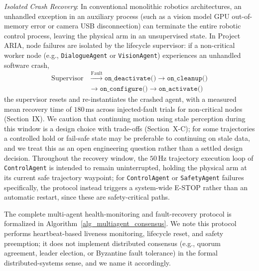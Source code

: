 \documentclass[journal]{IEEEtran}
\begin{document}
\textit{Isolated Crash Recovery}: In conventional monolithic robotics architectures, an unhandled exception in an auxiliary process (such as a vision model GPU out-of-memory error or camera USB disconnection) can terminate the entire robotic control process, leaving the physical arm in an unsupervised state. In Project ARIA, node failures are isolated by the lifecycle supervisor: if a non-critical worker node (e.g., \texttt{DialogueAgent} or \texttt{VisionAgent}) experiences an unhandled software crash,
\begin{equation}
\begin{split}
\text{Supervisor} &\xrightarrow{\text{Fault}} \texttt{on\_deactivate()} \to \texttt{on\_cleanup()} \\
&\to \texttt{on\_configure()} \to \texttt{on\_activate()}
\end{split}
\end{equation}
the supervisor resets and re-instantiates the crashed agent, with a measured mean recovery time of $180$\,ms across injected-fault trials for non-critical nodes (Section~IX). We caution that continuing motion using stale perception during this window is a design choice with trade-offs (Section~X-C); for some trajectories a controlled hold or fail-safe state may be preferable to continuing on stale data, and we treat this as an open engineering question rather than a settled design decision. Throughout the recovery window, the $50$\,Hz trajectory execution loop of \texttt{ControlAgent} is intended to remain uninterrupted, holding the physical arm at its current safe trajectory waypoint; for \texttt{ControlAgent} or \texttt{SafetyAgent} failures specifically, the protocol instead triggers a system-wide E-STOP rather than an automatic restart, since these are safety-critical paths.

The complete multi-agent health-monitoring and fault-recovery protocol is formalized in Algorithm~\ref{alg_multiagent_consensus}. We note this protocol performs heartbeat-based liveness monitoring, lifecycle reset, and safety preemption; it does not implement distributed consensus (e.g., quorum agreement, leader election, or Byzantine fault tolerance) in the formal distributed-systems sense, and we name it accordingly.
\end{document}

